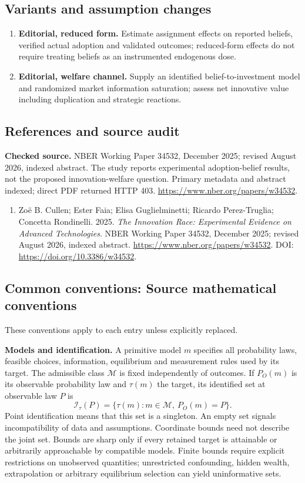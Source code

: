 \documentclass[11pt,a4paper]{article}
\begin{document}
\subsection*{Variants and assumption changes}
\begin{enumerate}
\item \textbf{Editorial, reduced form.} Estimate assignment effects on reported beliefs, verified actual adoption and validated outcomes; reduced-form effects do not require treating beliefs as an instrumented endogenous dose.
\item \textbf{Editorial, welfare channel.} Supply an identified belief-to-investment model and randomized market information saturation; assess net innovative value including duplication and strategic reactions.
\end{enumerate}
\subsection*{References and source audit}
\textbf{Checked source.} NBER Working Paper 34532, December 2025; revised August 2026, indexed abstract. The study reports experimental adoption-belief results, not the proposed innovation-welfare question. Primary metadata and abstract indexed; direct PDF returned HTTP 403. \url{https://www.nber.org/papers/w34532}.
\begin{enumerate}\raggedright
\item\hypertarget{definitions:source:30007695:1}{} Zoë B. Cullen; Ester Faia; Elisa Guglielminetti; Ricardo Perez-Truglia; Concetta Rondinelli. 2025. \emph{The Innovation Race: Experimental Evidence on Advanced Technologies}. NBER Working Paper 34532, December 2025; revised August 2026, indexed abstract.
\url{https://www.nber.org/papers/w34532}.
DOI: \url{https://doi.org/10.3386/w34532}.
\end{enumerate}

\subsection*{Common conventions: Source mathematical conventions}

These conventions apply to each entry unless explicitly replaced.

\textbf{Models and identification.} A primitive model \(m\) specifies all probability laws, feasible choices, information, equilibrium and measurement rules used by its target. The admissible class \(\mathcal M\) is fixed independently of outcomes. If \(P_O(m)\) is its observable probability law and \(\tau(m)\) the target, its identified set at observable law \(P\) is
\[
 \mathcal I_\tau(P)=\{\tau(m):m\in\mathcal M,\ P_O(m)=P\}.
\]
Point identification means that this set is a singleton. An empty set signals incompatibility of data and assumptions. Coordinate bounds need not describe the joint set. Bounds are sharp only if every retained target is attainable or arbitrarily approachable by compatible models. Finite bounds require explicit restrictions on unobserved quantities; unrestricted confounding, hidden wealth, extrapolation or arbitrary equilibrium selection can yield uninformative sets.
\end{document}
